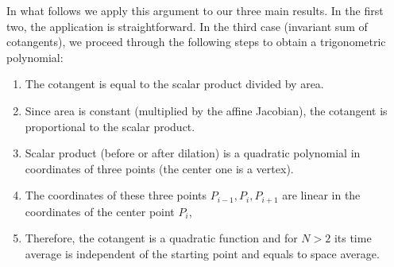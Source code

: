 In what follows we apply this argument to our three main results. In the first two, the application is straightforward. In the third case (invariant sum of cotangents), we proceed through the following steps to obtain a trigonometric polynomial:

\begin{enumerate}
    \item The cotangent is equal to the scalar product divided by area.
\item Since area is constant (multiplied by the affine Jacobian), the cotangent is proportional to the scalar product.

\item Scalar product (before or after dilation) is a quadratic polynomial in coordinates
of three points (the center one is a vertex).

\item The coordinates of these three points $P_{i-1},P_i,P_{i+1}$
are linear in the coordinates of the center point $P_i$, %
\item Therefore, the cotangent is a quadratic function and for $N>2$ its time average is independent
of the starting point and equals to space average.
\end{enumerate}



